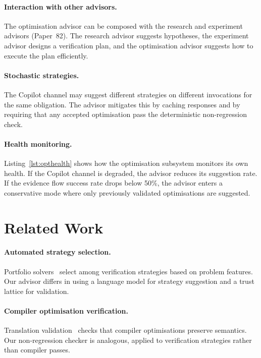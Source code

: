 \documentclass[11pt]{article}
\begin{document}
\paragraph{Interaction with other advisors.}
The optimisation advisor can be composed with the
research and experiment advisors (Paper~82).  The
research advisor suggests hypotheses, the experiment
advisor designs a verification plan, and the
optimisation advisor suggests how to execute the
plan efficiently.

\paragraph{Stochastic strategies.}
The Copilot channel may suggest different strategies
on different invocations for the same obligation.
The advisor mitigates this by caching responses and
by requiring that any accepted optimisation pass the
deterministic non-regression check.

\paragraph{Health monitoring.}
Listing~\ref{lst:opthealth} shows how the optimisation
subsystem monitors its own health.  If the Copilot
channel is degraded, the advisor reduces its suggestion
rate.  If the evidence flow success rate drops below
50\%, the advisor enters a conservative mode where
only previously validated optimisations are suggested.

\section{Related Work}\label{sec:related}

\paragraph{Automated strategy selection.}
Portfolio solvers~\cite{xu2008satzilla} select among
verification strategies based on problem features.
Our advisor differs in using a language model for
strategy suggestion and a trust lattice for validation.

\paragraph{Compiler optimisation verification.}
Translation validation~\cite{pnueli1998translation}
checks that compiler optimisations preserve semantics.
Our non-regression checker is analogous, applied to
verification strategies rather than compiler passes.
\end{document}
